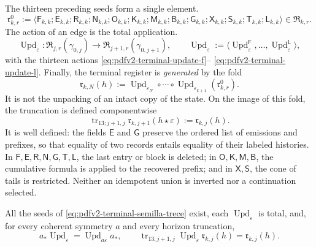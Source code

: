 The thirteen preceding seeds form a single element.
\begin{equation}
\label{eq:pdfv2-terminal-semilla-trece}
 \mathfrak r^0_{k,r}:=
 \langle
 \mathsf F_{k,k};\mathsf E_{k,k};\mathsf R_{k,k};\mathsf N_{k,k};
 \mathsf O_{k,k};\mathsf K_{k,k};\mathsf M_{k,k};\mathsf B_{k,k};
 \mathsf G_{k,k};\mathsf X_{k,k};\mathsf S_{k,k};\mathsf T_{k,k};
 \mathsf L_{k,k}
 \rangle\in\mathfrak R_{k,r}.
\end{equation}
The action of an edge is the total application.
\begin{equation}
\label{eq:pdfv2-terminal-actualizacion-unica}
 \operatorname{Upd}_\varepsilon:
 \mathfrak R_{j,r}(\gamma_{0,j})
 \longrightarrow\mathfrak R_{j+1,r}(\gamma_{0,j+1}),\qquad
 \operatorname{Upd}_\varepsilon:=
 \langle\operatorname{Upd}^{\mathsf F}_\varepsilon,\ldots,
 \operatorname{Upd}^{\mathsf L}_\varepsilon\rangle,
\end{equation}
with the thirteen actions
\eqref{eq:pdfv2-terminal-update-f}--
\eqref{eq:pdfv2-terminal-update-l}. Finally, the terminal register is
\emph{generated} by the fold
\begin{equation}
\label{eq:pdfv2-terminal-registro-trece}
 \boxed{
 \mathfrak r_{k,N}(h):=
 \operatorname{Upd}_{\varepsilon_N}\circ\cdots\circ
 \operatorname{Upd}_{\varepsilon_{k+1}}(\mathfrak r^0_{k,r}).}
\end{equation}
It is not the unpacking of an intact copy of the state.
On the image of this fold, the truncation is defined componentwise
\begin{equation}
\label{eq:pdfv2-terminal-truncamiento-trece-def}
 \operatorname{tr}_{13;j+1,j}
 \mathfrak r_{k,j+1}(h\star\varepsilon)
 :=\mathfrak r_{k,j}(h).
\end{equation}
It is well defined: the fields \(\mathsf E\) and \(\mathsf G\) preserve the
ordered list of emissions and prefixes, so that equality of two
records entails equality of their labeled histories. In
\(\mathsf F,\mathsf E,\mathsf R,\mathsf N,\mathsf G,\mathsf T,\mathsf L\),
the last entry or block is deleted; in \(\mathsf O,\mathsf K,\mathsf M,
\mathsf B\), the cumulative formula is applied to the recovered prefix; and in
\(\mathsf X,\mathsf S\), the cone of tails is restricted. Neither an
idempotent union is inverted nor a continuation selected.

\begin{proposition}
\label{prop:pdfv2-terminal-trece-total-natural}
All the seeds of \eqref{eq:pdfv2-terminal-semilla-trece} exist, each
\(\operatorname{Upd}_\varepsilon\) is total, and, for every coherent symmetry
\(a\) and every horizon truncation,
\begin{equation}
\label{eq:pdfv2-terminal-trece-naturalidad}
 a_*\operatorname{Upd}_\varepsilon
 =\operatorname{Upd}_{a\varepsilon}a_*,
 \qquad
 \operatorname{tr}_{13;j+1,j}
 \operatorname{Upd}_\varepsilon\mathfrak r_{k,j}(h)
 =\mathfrak r_{k,j}(h).
\end{equation}
\end{proposition}

